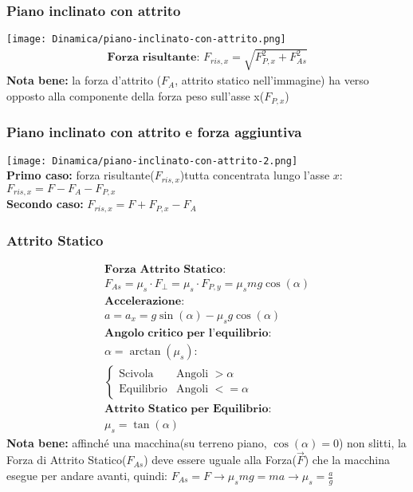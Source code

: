 \subsubsection{Piano inclinato con attrito}
\texttt{[image: Dinamica/piano-inclinato-con-attrito.png]} \\
\begin{gather*}
    \textbf{Forza risultante: } F_{ris, x} = \sqrt{F_{P, x}^2 + F_{As}^2}
\end{gather*}
\textbf{Nota bene: } la forza d'attrito ($F_{A}$, attrito statico nell'immagine) ha verso opposto alla componente della forza peso sull'asse x($F_{P, x}$)
\subsubsection{Piano inclinato con attrito e forza aggiuntiva}
\texttt{[image: Dinamica/piano-inclinato-con-attrito-2.png]} \\
\textbf{Primo caso: } forza risultante($F_{ris, x}$)tutta concentrata lungo l'asse $x$: $F_{ris, x} = F - F_A - F_{P, x}$ \\
\textbf{Secondo caso: } $F_{ris, x} = F + F_{P, x} - F_A$ \\

\subsubsection{Attrito Statico}
\begin{gather*}
    \textbf{Forza Attrito Statico: } \\ F_{As} = \mu_s \cdot F_\perp = \mu_s \cdot F_{P, y} = \mu_s m g \cos (\alpha) \\
    \textbf{Accelerazione: } \\ a = a_x = g \sin (\alpha) - \mu_s g \cos (\alpha) \\
    \textbf{Angolo critico per l'equilibrio: } \\ \alpha = \arctan (\mu_s) : \\
    \begin{cases}
        \text{Scivola}    & \text{Angoli } > \alpha  \\
        \text{Equilibrio} & \text{Angoli } <= \alpha
    \end{cases}    \\
    \textbf{Attrito Statico per Equilibrio: } \\ \mu_s = \tan (\alpha)
\end{gather*}
\textbf{Nota bene: } affinché una macchina(su terreno piano, $\cos (\alpha) = 0$) non slitti, la Forza di Attrito Statico($F_{As}$) deve essere uguale alla Forza($\vec{F}$) che la macchina esegue per andare avanti, quindi: $F_{As} = F \rightarrow \mu_s m g = m a \rightarrow \mu_s = \frac{a}{g}$
